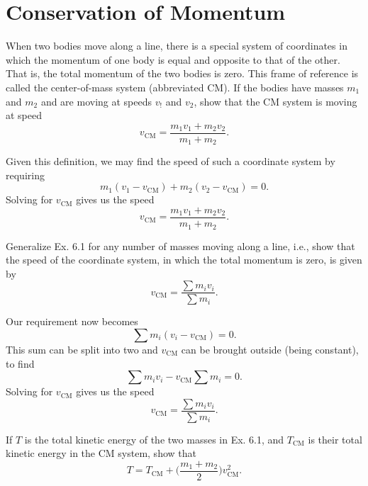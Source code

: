 \documentclass[../feynman-lectures-on-physics.tex]{subfiles}
\begin{document}
\printanswers

\section{Conservation of Momentum}

\begin{questions}

	\question When two bodies move along a line, there is a special system of
	coordinates in which the momentum of one body is equal and opposite to that of
	the other. That is, the total momentum of the two bodies is zero. This frame
	of reference is called the center-of-mass system (abbreviated CM). If the
	bodies have masses $m_1$ and $m_2$ and are moving at speeds $v_!$ and $v_2$,
	show that the CM system is moving at speed
	\[
		v_{\text{CM}} = \frac{m_1v_1 + m_2v_2}{m_1+m_2}.
	\]

	\begin{solution}
		Given this definition, we may find the speed of such a coordinate system
		by requiring
		\[
			m_1(v_1-v_{\text{CM}}) + m_2(v_2-v_{\text{CM}}) = 0.
		\]
		Solving for $v_{\text{CM}}$ gives us the speed
		\[
			v_{\text{CM}} = \frac{m_1v_1 + m_2v_2}{m_1+m_2}.
		\]
	\end{solution}

	\question Generalize Ex. 6.1 for any number of masses moving along a line, i.e.,
	show that the speed of the coordinate system, in which the total momentum is
	zero, is given by
	\[
		v_{\text{CM}} = \frac{\sum m_iv_i}{\sum m_i}.
	\]

	\begin{solution}
		Our requirement now becomes
		\[
			\sum m_i(v_i - v_{\text{CM}}) = 0.
		\]
		This sum can be split into two and $v_{\text{CM}}$ can be brought outside
		(being constant), to find
		\[
			\sum m_iv_i - v_{\text{CM}}\sum m_i = 0.
		\]
		Solving for $v_{\text{CM}}$ gives us the speed
		\[
			v_{\text{CM}} = \frac{\sum m_iv_i}{\sum m_i}.
		\]
	\end{solution}

	\question If $T$ is the total kinetic energy of the two masses in Ex. 6.1, and
	$T_{\text{CM}}$ is their total kinetic energy in the CM system, show that
	\[
		T = T_{\text{CM}} + \Big(\frac{m_1+m_2}{2}\Big)v^2_{\text{CM}}.
	\]


\end{questions}
\end{document}
